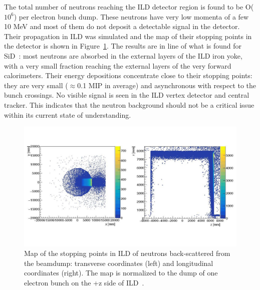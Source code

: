 The total number of neutrons reaching the ILD detector region is found to be O($10^6$) per electron bunch dump. These neutrons have very low momenta of a few 10 MeV and most of them do not deposit a detectable signal in the detector. Their propagation in ILD was simulated and the map of their stopping points in the detector is shown in Figure~\ref{fig:integration:neutrons}. The results are in line of what is found for SiD~\cite{ild:bib:schuetz_thesis}: most neutrons are absorbed in the external layers of the ILD iron yoke, with a very small fraction reaching the external layers of the very forward calorimeters. Their energy depositions concentrate close to their stopping points: they are very small ($\approx$0.1 MIP in average) and asynchronous with respect to the bunch crossings. No visible signal is seen in the ILD vertex detector and central tracker. This indicates that the neutron background should not be a critical issue within its current state of understanding.

\begin{figure}[t!]
\includegraphics[width=1.0\hsize]{Integration/fig/BG_neutrons.jpg}
\caption{\label{fig:integration:neutrons}Map of the stopping points in ILD of neutrons back-scattered from the beamdump: transverse coordinates (left) and longitudinal coordinates (right). The map is normalized to the dump of one electron bunch on the +z side of ILD~\cite{ild:bib:schuetz_thesis}.}
\end{figure}

\vspace{2cm}